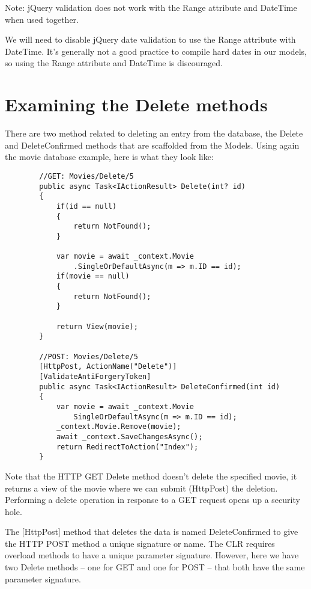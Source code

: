 \documentclass{report}
\begin{document}
    Note: jQuery validation does not work with the Range attribute and DateTime when used together.

    We will need to disable jQuery date validation to use the Range attribute with DateTime. It's generally
    not a good practice to compile hard dates in our models, so using the Range attribute and DateTime
    is discouraged.

    \chapter{Examining the Delete methods}
    There are two method related to deleting an entry from the database, the Delete and DeleteConfirmed
    methods that are scaffolded from the Models. Using again the movie database example, here is what they
    look like:

    \lstset{style=sharpc}
    \begin{lstlisting}
        //GET: Movies/Delete/5
        public async Task<IActionResult> Delete(int? id)
        {
            if(id == null)
            {
                return NotFound();
            }

            var movie = await _context.Movie
                .SingleOrDefaultAsync(m => m.ID == id);
            if(movie == null)
            {
                return NotFound();
            }

            return View(movie);
        }

        //POST: Movies/Delete/5
        [HttpPost, ActionName("Delete")]
        [ValidateAntiForgeryToken]
        public async Task<IActionResult> DeleteConfirmed(int id)
        {
            var movie = await _context.Movie
                SingleOrDefaultAsync(m => m.ID == id);
            _context.Movie.Remove(movie);
            await _context.SaveChangesAsync();
            return RedirectToAction("Index");
        }
    \end{lstlisting}

    Note that the HTTP GET Delete method doesn't delete the specified movie,
    it returns a view of the movie where we can submit (HttpPost) the deletion.
    Performing a delete operation in response to a GET request opens up a
    security hole.

    The [HttpPost] method that deletes the data is named DeleteConfirmed to give
    the HTTP POST method a unique signature or name. The CLR requires overload
    methods to have a unique parameter signature. However, here we have two Delete
    methods -- one for GET and one for POST -- that both have the same parameter
    signature.
\end{document}
